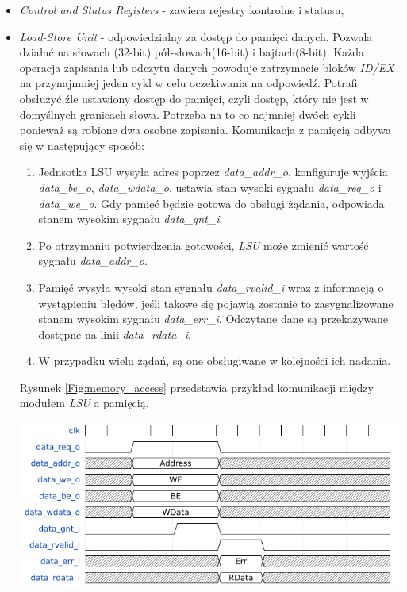 \documentclass[11pt,a4paper]{article}
\begin{document}
\begin{itemize}
	\item \textit{Control and Status Registers} - zawiera rejestry kontrolne i statusu,
	\item \textit{Load-Store Unit} - odpowiedzialny za dostęp do pamięci danych. Pozwala działać na słowach (32-bit) pół-słowach(16-bit) i bajtach(8-bit). Każda operacja zapisania lub odczytu danych powoduje zatrzymacie bloków \textit{ID/EX} na przynajmniej jeden cykl w celu oczekiwania na odpowiedź. Potrafi obsłużyć źle   ustawiony dostęp do pamięci, czyli dostęp, który nie jest w domyślnych granicach słowa. Potrzeba na to co najmniej dwóch cykli ponieważ są robione dwa osobne zapisania. Komunikacja z pamięcią odbywa się w następujący sposób:
		\begin{enumerate}
			\item Jednsotka LSU wysyła adres poprzez \textit{data\_addr\_o}, konfiguruje wyjścia \textit{data\_be\_o}, \textit{data\_wdata\_o}, ustawia stan wysoki sygnału \textit{data\_req\_o} i \textit{data\_we\_o}. Gdy pamięć będzie gotowa do obsługi żądania, odpowiada stanem wysokim sygnału \textit{data\_gnt\_i}.
			\item Po otrzymaniu potwierdzenia gotowości, \textit{LSU} może zmienić wartość sygnału \textit{data\_addr\_o}.
			\item Pamięć wysyła wysoki stan sygnału \textit{data\_rvalid\_i} wraz z informacją o wystąpieniu błędów, jeśli takowe się pojawią zostanie to zasygnalizowane stanem wysokim sygnału \textit{data\_err\_i}. Odczytane dane są przekazywane dostępne na linii \textit{data\_rdata\_i}.
			\item W przypadku wielu żądań, są one obsługiwane w kolejności ich nadania.
		\end{enumerate}
		Rysunek \ref{Fig:memory_access} przedstawia przykład komunikacji między modułem \textit{LSU} a pamięcią.
			\begin{samepage}

				\nopagebreak
				\begin{center}
					\includegraphics[width=14cm]{./rysunki/memory_access.png}
				\end{center}
			\end{samepage}

\end{itemize}
		 
\end{document}
